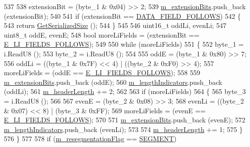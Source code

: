 \begin{DoxyCode}
537 
538       extensionBit = (byte\_1 & 0x04) >> 2;
539       \hyperlink{classns3_1_1LteRlcAmHeader_a74d6d748a89f21632a351e02adb7c0ad}{m\_extensionBits}.push\_back (extensionBit);
540 
541       \textcolor{keywordflow}{if} (extensionBit == \hyperlink{classns3_1_1LteRlcAmHeader_a516bc34a521085f22b455aeac9ebc364ad70b61eeac2e18a01f13b8f94530ba1f}{DATA\_FIELD\_FOLLOWS})
542         \{
543           \textcolor{keywordflow}{return} \hyperlink{classns3_1_1LteRlcAmHeader_a246844a4cd9772f5b926aaa27be229b9}{GetSerializedSize} ();
544         \}
545 
546       uint16\_t oddLi, evenLi;
547       uint8\_t oddE, evenE;
548       \textcolor{keywordtype}{bool} moreLiFields = (extensionBit == \hyperlink{classns3_1_1LteRlcAmHeader_a516bc34a521085f22b455aeac9ebc364aef53e53d29f464e8cb34fd6fede4b18c}{E\_LI\_FIELDS\_FOLLOWS});
549 
550       \textcolor{keywordflow}{while} (moreLiFields)
551         \{
552           byte\_1 = i.ReadU8 ();
553           byte\_2 = i.ReadU8 ();
554 
555           oddE = (byte\_1 & 0x80) >> 7;
556           oddLi = ((byte\_1 & 0x7F) << 4) | ((byte\_2 & 0xF0) >> 4);
557           moreLiFields = (oddE == \hyperlink{classns3_1_1LteRlcAmHeader_a516bc34a521085f22b455aeac9ebc364aef53e53d29f464e8cb34fd6fede4b18c}{E\_LI\_FIELDS\_FOLLOWS});
558 
559           \hyperlink{classns3_1_1LteRlcAmHeader_a74d6d748a89f21632a351e02adb7c0ad}{m\_extensionBits}.push\_back (oddE);
560           \hyperlink{classns3_1_1LteRlcAmHeader_af844efce56d400df7aa9224c4df37f84}{m\_lengthIndicators}.push\_back (oddLi);
561           \hyperlink{classns3_1_1LteRlcAmHeader_a3c565f3b6b45d813ea11f05118898fe8}{m\_headerLength} += 2;
562 
563           \textcolor{keywordflow}{if} (moreLiFields)
564             \{
565               byte\_3 = i.ReadU8 ();
566 
567               evenE = (byte\_2 & 0x08) >> 3;
568               evenLi = ((byte\_2 & 0x07) << 8) | (byte\_3 & 0xFF);
569               moreLiFields = (evenE == \hyperlink{classns3_1_1LteRlcAmHeader_a516bc34a521085f22b455aeac9ebc364aef53e53d29f464e8cb34fd6fede4b18c}{E\_LI\_FIELDS\_FOLLOWS});
570 
571               \hyperlink{classns3_1_1LteRlcAmHeader_a74d6d748a89f21632a351e02adb7c0ad}{m\_extensionBits}.push\_back (evenE);
572               \hyperlink{classns3_1_1LteRlcAmHeader_af844efce56d400df7aa9224c4df37f84}{m\_lengthIndicators}.push\_back (evenLi);
573 
574               \hyperlink{classns3_1_1LteRlcAmHeader_a3c565f3b6b45d813ea11f05118898fe8}{m\_headerLength} += 1;
575             \}
576         \}
577 
578       \textcolor{keywordflow}{if} (\hyperlink{classns3_1_1LteRlcAmHeader_acc84b28a7fb612bd28d1fd4a1646a5ea}{m\_resegmentationFlag} == \hyperlink{classns3_1_1LteRlcAmHeader_aa7a03eaac5875a18c2f95d3a0091d138a81153e1c386467eae03f6805ba812b83}{SEGMENT})

\end{DoxyCode}
